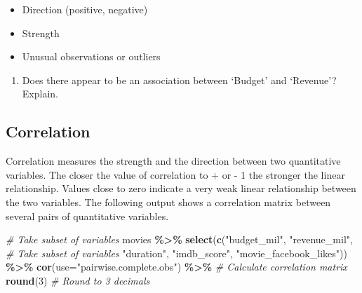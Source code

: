 \documentclass[
]{report}
\newenvironment{Shaded}{\begin{snugshade}}{\end{snugshade}}
\newcommand{\CommentTok}[1]{\textcolor[rgb]{0.56,0.35,0.01}{\textit{#1}}}
\newcommand{\DataTypeTok}[1]{\textcolor[rgb]{0.13,0.29,0.53}{#1}}
\newcommand{\DecValTok}[1]{\textcolor[rgb]{0.00,0.00,0.81}{#1}}
\newcommand{\KeywordTok}[1]{\textcolor[rgb]{0.13,0.29,0.53}{\textbf{#1}}}
\newcommand{\NormalTok}[1]{#1}
\newcommand{\OperatorTok}[1]{\textcolor[rgb]{0.81,0.36,0.00}{\textbf{#1}}}
\newcommand{\StringTok}[1]{\textcolor[rgb]{0.31,0.60,0.02}{#1}}
\providecommand{\tightlist}{%
  \setlength{\itemsep}{0pt}\setlength{\parskip}{0pt}}
\begin{document}
\begin{itemize}
\tightlist
\item
  Direction (positive, negative)
\end{itemize}

\vspace{.4in}

\begin{itemize}
\tightlist
\item
  Strength
\end{itemize}

\vspace{.4in}

\begin{itemize}
\tightlist
\item
  Unusual observations or outliers
\end{itemize}

\vspace{.4in}

\newpage

\begin{enumerate}
\def\labelenumi{\arabic{enumi}.}
\setcounter{enumi}{3}
\tightlist
\item
  Does there appear to be an association between `Budget' and `Revenue'? Explain.
\end{enumerate}

\vspace{1in}

\hypertarget{correlation}{%
\subsection{Correlation}\label{correlation}}

Correlation measures the strength and the direction between two quantitative variables. The closer the value of correlation to + or - 1 the stronger the linear relationship. Values close to zero indicate a very weak linear relationship between the two variables. The following output shows a correlation matrix between several pairs of quantitative variables.

\begin{Shaded}
\begin{Highlighting}[]
\CommentTok{\# Take subset of variables}
\NormalTok{movies }\OperatorTok{\%\textgreater{}\%}
\StringTok{  }\KeywordTok{select}\NormalTok{(}\KeywordTok{c}\NormalTok{(}\StringTok{"budget\_mil"}\NormalTok{, }\StringTok{"revenue\_mil"}\NormalTok{,  }\CommentTok{\# Take subset of variables}
           \StringTok{"duration"}\NormalTok{, }\StringTok{"imdb\_score"}\NormalTok{, }
           \StringTok{"movie\_facebook\_likes"}\NormalTok{)) }\OperatorTok{\%\textgreater{}\%}
\StringTok{  }\KeywordTok{cor}\NormalTok{(}\DataTypeTok{use=}\StringTok{"pairwise.complete.obs"}\NormalTok{) }\OperatorTok{\%\textgreater{}\%}\StringTok{ }\CommentTok{\# Calculate correlation matrix}
\StringTok{  }\KeywordTok{round}\NormalTok{(}\DecValTok{3}\NormalTok{)  }\CommentTok{\# Round to 3 decimals}
\end{Highlighting}
\end{Shaded}
\end{document}
